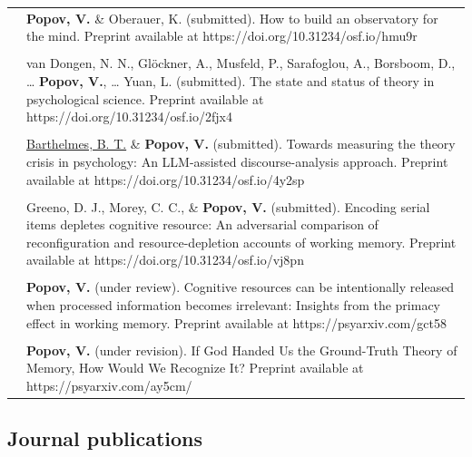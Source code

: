 \documentclass[letterpaper]{article}
\begin{document}
 \begin{longtable}{p{0.7cm}p{15cm}}
 & \textbf{Popov, V.} \& Oberauer, K. (submitted). How to build an observatory for the mind. Preprint available at https://doi.org/10.31234/osf.io/hmu9r\\[6pt]
&\\
& van Dongen, N. N., Glöckner, A., Musfeld, P., Sarafoglou, A., Borsboom, D., … \textbf{Popov, V.}, … Yuan, L. (submitted). The state and status of theory in psychological science. Preprint available at https://doi.org/10.31234/osf.io/2fjx4\\[6pt]
&\\
& \underline{Barthelmes, B. T.} \& \textbf{Popov, V.} (submitted). Towards measuring the theory crisis in psychology: An LLM-assisted discourse-analysis approach. Preprint available at https://doi.org/10.31234/osf.io/4y2sp\\[6pt]
&\\
& Greeno, D. J., Morey, C. C., \& \textbf{Popov, V.} (submitted). Encoding serial items depletes cognitive resource: An adversarial comparison of reconfiguration and resource-depletion accounts of working memory. Preprint available at https://doi.org/10.31234/osf.io/vj8pn\\[6pt]
&\\
 & \textbf{Popov, V.} (under review). Cognitive resources can be intentionally released when processed information becomes irrelevant: Insights from the primacy effect in working memory. Preprint available at https://psyarxiv.com/gct58\\[6pt]
&\\
& \textbf{Popov, V.} (under revision). If God Handed Us the Ground-Truth Theory of Memory, How Would We Recognize It? Preprint available at https://psyarxiv.com/ay5cm/\\
 \end{longtable}

\subsection*{Journal publications}
\end{document}
